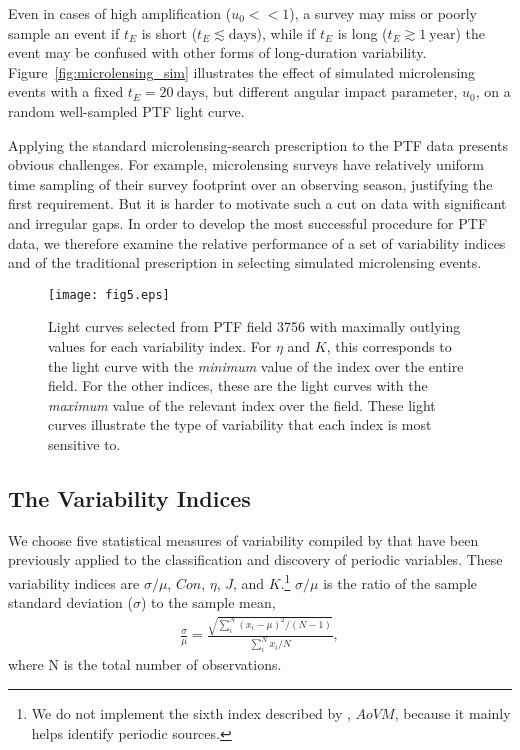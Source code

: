 \documentclass{emulateapj}
\begin{document}
Even in cases of high amplification ($u_0<<1$), a survey may miss or poorly sample an event if $t_E$ is short ($t_E \lesssim\mathrm{days}$), while if $t_E$ is long ($t_E \gtrsim 1~\mathrm{year}$) the event may be confused with other forms of long-duration variability. Figure~\ref{fig:microlensing_sim} illustrates the effect of simulated microlensing events with a fixed $t_E=20~\mathrm{days}$, but different angular impact parameter, $u_0$, on a random well-sampled PTF light curve. 

Applying the standard microlensing-search prescription to the PTF data presents obvious challenges. For example, microlensing surveys have relatively uniform time sampling of their survey footprint over an observing season, justifying the first requirement. But it is harder to motivate such a cut on data with significant and irregular gaps. In order to develop the most successful procedure for PTF data, we therefore examine the relative performance of a set of variability indices and of the traditional prescription in selecting simulated microlensing events.

\begin{figure}[h]
\centering\texttt{[image: fig5.eps]}
\caption{Light curves selected from PTF field 3756 with maximally outlying values for each variability index. For $\eta$ and $K$, this corresponds to the light curve with the \emph{minimum} value of the index over the entire field. For the other indices, these are the light curves with the \emph{maximum} value of the relevant index over the field. These light curves illustrate the type of variability that each index is most sensitive to. } \label{fig:indices_examples}
\end{figure}

\subsection{The Variability Indices} 
We choose five statistical measures of variability compiled by \cite{shin2009} that have been previously applied to the classification and discovery of periodic variables. These variability indices are $\sigma/\mu$, $Con$, $\eta$, $J$, and $K$.\footnote{We do not implement the sixth index described by \cite{shin2009}, $AoVM$, because it mainly helps identify periodic sources.} $\sigma/\mu$ is the ratio of the sample standard deviation ($\sigma$) to the sample mean, 
\begin{align}
	\frac{\sigma}{\mu} = \frac{\sqrt{\sum^N_i (x_i - \mu)^2 / (N-1)}}{\sum^N_i x_i/N},
\end{align}
where N is the total number of observations. 
\end{document}
